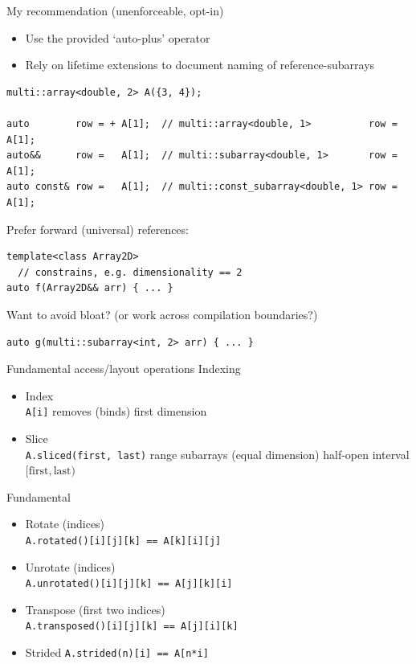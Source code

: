 \begin{frame}[fragile]{My recommendation (unenforceable, opt-in)}
\begin{itemize}
  \item Use the provided `auto-plus' operator
  \item Rely on lifetime extensions  to document naming of reference-subarrays
\end{itemize}
\begin{lstlisting}
multi::array<double, 2> A({3, 4});

auto        row = + A[1];  // multi::array<double, 1>          row = A[1];
auto&&      row =   A[1];  // multi::subarray<double, 1>       row = A[1];
auto const& row =   A[1];  // multi::const_subarray<double, 1> row = A[1];
\end{lstlisting}

Prefer forward (universal) references:
\begin{lstlisting}
template<class Array2D>
  // constrains, e.g. dimensionality == 2
auto f(Array2D&& arr) { ... }
\end{lstlisting}

Want to avoid bloat? (or work across compilation boundaries?)
\begin{lstlisting}
auto g(multi::subarray<int, 2> arr) { ... }
\end{lstlisting}
\end{frame}

\begin{frame}{Fundamental access/layout operations}
Indexing
\begin{itemize}
\item Index\\
  \lstinline|A[i]| removes (binds) first dimension
\item Slice\\
  \lstinline|A.sliced(first, last)| range subarrays (equal dimension) half-open interval \([\mathrm{first}, \mathrm{last}) \)
\end{itemize}

Fundamental
\begin{itemize}
\item Rotate (indices) \\
  \lstinline|A.rotated()[i][j][k] == A[k][i][j]|
\item Unrotate (indices) \\
  \lstinline|A.unrotated()[i][j][k] == A[j][k][i]|
\item Transpose (first two indices) \\
  \lstinline|A.transposed()[i][j][k] == A[j][i][k]|
\item Strided
  \lstinline|A.strided(n)[i] == A[n*i]|
\end{itemize}
\end{frame}

